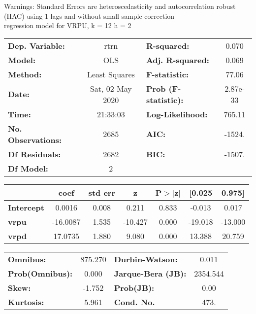 Warnings: \newline
 [1] Standard Errors are heteroscedasticity and autocorrelation robust (HAC) using 1 lags and without small sample correction\\ 

regression model for VRPU, k = 12 h = 2\begin{center}
\begin{tabular}{lclc}
\toprule
\textbf{Dep. Variable:}    &       rtrn       & \textbf{  R-squared:         } &     0.070   \\
\textbf{Model:}            &       OLS        & \textbf{  Adj. R-squared:    } &     0.069   \\
\textbf{Method:}           &  Least Squares   & \textbf{  F-statistic:       } &     77.06   \\
\textbf{Date:}             & Sat, 02 May 2020 & \textbf{  Prob (F-statistic):} &  2.87e-33   \\
\textbf{Time:}             &     21:33:03     & \textbf{  Log-Likelihood:    } &    765.11   \\
\textbf{No. Observations:} &        2685      & \textbf{  AIC:               } &    -1524.   \\
\textbf{Df Residuals:}     &        2682      & \textbf{  BIC:               } &    -1507.   \\
\textbf{Df Model:}         &           2      & \textbf{                     } &             \\
\bottomrule
\end{tabular}
\begin{tabular}{lcccccc}
                   & \textbf{coef} & \textbf{std err} & \textbf{z} & \textbf{P$> |$z$|$} & \textbf{[0.025} & \textbf{0.975]}  \\
\midrule
\textbf{Intercept} &       0.0016  &        0.008     &     0.211  &         0.833        &       -0.013    &        0.017     \\
\textbf{vrpu}      &     -16.0087  &        1.535     &   -10.427  &         0.000        &      -19.018    &      -13.000     \\
\textbf{vrpd}      &      17.0735  &        1.880     &     9.080  &         0.000        &       13.388    &       20.759     \\
\bottomrule
\end{tabular}
\begin{tabular}{lclc}
\textbf{Omnibus:}       & 875.270 & \textbf{  Durbin-Watson:     } &    0.011  \\
\textbf{Prob(Omnibus):} &   0.000 & \textbf{  Jarque-Bera (JB):  } & 2354.544  \\
\textbf{Skew:}          &  -1.752 & \textbf{  Prob(JB):          } &     0.00  \\
\textbf{Kurtosis:}      &   5.961 & \textbf{  Cond. No.          } &     473.  \\
\bottomrule
\end{tabular}
\end{center}

